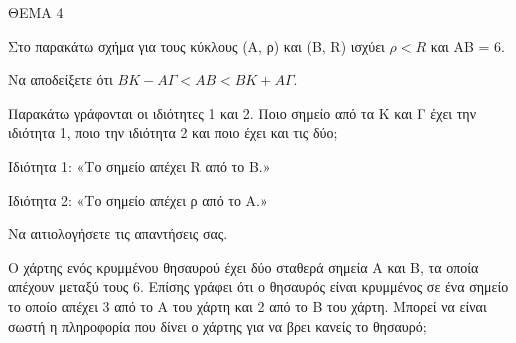 
ΘΕΜΑ 4

\begin{alist}
\item Στο παρακάτω σχήμα για τους κύκλους (Α, ρ) και (Β, R) ισχύει $\rho < R$ και ΑΒ = 6.



\begin{rlist}
\item Να αποδείξετε ότι $ΒK - Α\Gamma < ΑΒ < ΒK + Α\Gamma$.

\item Παρακάτω γράφονται οι ιδιότητες 1 και 2. Ποιο σημείο από τα Κ και Γ έχει την ιδιότητα 1, ποιο την ιδιότητα 2 και ποιο έχει και τις δύο;

Ιδιότητα 1: «Το σημείο απέχει R από το Β.»

Ιδιότητα 2: «Το σημείο απέχει ρ από το Α.»

Να αιτιολογήσετε τις απαντήσεις σας.


\end{rlist}
\item Ο χάρτης ενός κρυμμένου θησαυρού έχει δύο σταθερά σημεία Α και Β, τα οποία απέχουν μεταξύ τους 6. Επίσης γράφει ότι ο θησαυρός είναι κρυμμένος σε ένα σημείο το οποίο απέχει 3 από το Α του χάρτη και 2 από το Β του χάρτη. Μπορεί να είναι σωστή η πληροφορία που δίνει ο χάρτης για να βρει κανείς το θησαυρό;

\end{alist}
